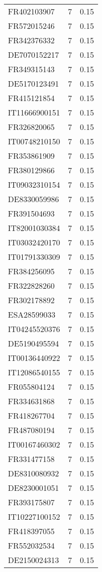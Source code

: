 \begin{table*}[htbp]
\begin{tabular}{lrr}
FR402103907 & 7 & 0.15 \\
FR572015246 & 7 & 0.15 \\
FR342376332 & 7 & 0.15 \\
DE7070152217 & 7 & 0.15 \\
FR349315143 & 7 & 0.15 \\
DE5170123491 & 7 & 0.15 \\
FR415121854 & 7 & 0.15 \\
IT11666900151 & 7 & 0.15 \\
FR326820065 & 7 & 0.15 \\
IT00748210150 & 7 & 0.15 \\
FR353861909 & 7 & 0.15 \\
FR380129866 & 7 & 0.15 \\
IT09032310154 & 7 & 0.15 \\
DE8330059986 & 7 & 0.15 \\
FR391504693 & 7 & 0.15 \\
IT82001030384 & 7 & 0.15 \\
IT03032420170 & 7 & 0.15 \\
IT01791330309 & 7 & 0.15 \\
FR384256095 & 7 & 0.15 \\
FR322828260 & 7 & 0.15 \\
FR302178892 & 7 & 0.15 \\
ESA28599033 & 7 & 0.15 \\
IT04245520376 & 7 & 0.15 \\
DE5190495594 & 7 & 0.15 \\
IT00136440922 & 7 & 0.15 \\
IT12086540155 & 7 & 0.15 \\
FR055804124 & 7 & 0.15 \\
FR334631868 & 7 & 0.15 \\
FR418267704 & 7 & 0.15 \\
FR487080194 & 7 & 0.15 \\
IT00167460302 & 7 & 0.15 \\
FR331477158 & 7 & 0.15 \\
DE8310080932 & 7 & 0.15 \\
DE8230001051 & 7 & 0.15 \\
FR393175807 & 7 & 0.15 \\
IT10227100152 & 7 & 0.15 \\
FR418397055 & 7 & 0.15 \\
FR552032534 & 7 & 0.15 \\
DE2150024313 & 7 & 0.15 \\

\end{tabular}
\end{table*}
